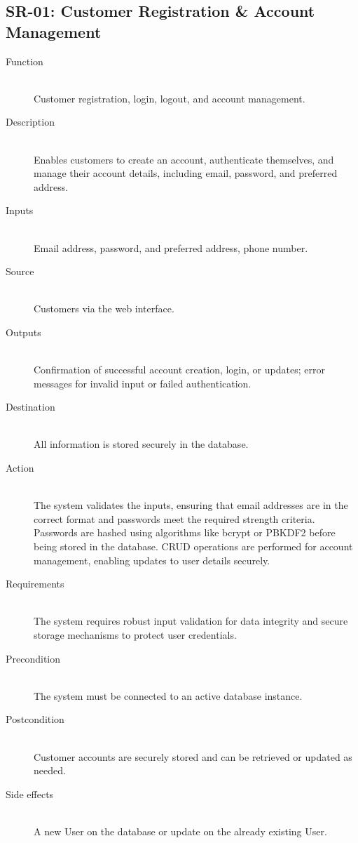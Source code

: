 \documentclass[twoside,a4paper,journal]{IEEEtran}
\begin{document}
\subsection{SR-01: Customer Registration \& Account Management}
\begin{description}
  \item[Function] \hfill \\
  Customer registration, login, logout, and account management.
  \item[Description] \hfill \\
  Enables customers to
  create an account, authenticate themselves, and manage their account details,
  including email, password, and preferred address.
  \item[Inputs] \hfill \\
  Email address,
  password, and preferred address, phone number.
  \item[Source] \hfill \\
  Customers via the
  web interface.
  \item[Outputs] \hfill \\
  Confirmation of
  successful account creation, login, or updates; error messages for invalid
  input or failed authentication.
  \item[Destination] \hfill \\
  All information is
  stored securely in the database.
  \item[Action] \hfill \\
  The system validates the inputs, ensuring that email
  addresses are in the correct format and passwords meet the required strength
  criteria. Passwords are hashed using algorithms like bcrypt or PBKDF2 before
  being stored in the database. CRUD operations are performed for account
  management, enabling updates to user details securely.
  \item[Requirements] \hfill \\
  The system requires robust input validation for data
  integrity and secure storage mechanisms to protect user credentials.
  \item[Precondition] \hfill \\
  The system must be connected to an active database
  instance.
  \item[Postcondition] \hfill \\
  Customer accounts are securely stored and can be
  retrieved or updated as needed.
  \item[Side effects] \hfill \\
  A new User on the database or update on the already
  existing User.
\end{description}
\end{document}
